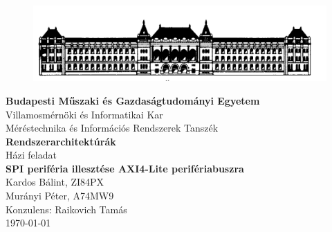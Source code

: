 \documentclass[a4paper,11pt]{article}
\begin{document}
\sloppy

\begin{titlepage}
\begin{center}
\begin{figure}[t!]
	\begin{center}
	\includegraphics[scale=0.2]{bme.png}
	\label{a:bme}
	\end{center}
\end{figure}
\textbf{{Budapesti Műszaki és Gazdaságtudományi Egyetem}}\\
Villamosmérnöki és Informatikai Kar\\
Méréstechnika és Információs Rendszerek Tanszék\\
\vfill
\huge\textbf{{Rendszerarchitektúrák}}\\[3mm]
\Large{Házi feladat}\\[3mm]
\Large\textbf{{SPI periféria illesztése AXI4-Lite perifériabuszra}}\\
\vfill
\Large{Kardos Bálint, ZI84PX}\\
\Large{Murányi Péter, A74MW9}\\
\Large{Konzulens: Raikovich Tamás}\\
\vfill
\today \\

\end{center}
\end{titlepage}

\tableofcontents
\thispagestyle{empty}
\clearpage
\setlength{\parindent}{0em}
\setlength{\parskip}{1em}

\setcounter{page}{1}
\setcounter{tocdepth}{4}
\setcounter{secnumdepth}{4}
\end{document}
